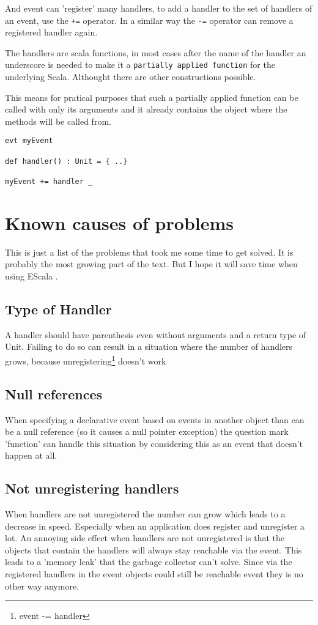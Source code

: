 \documentclass{article}
\newcommand{\escala}[0]{EScala }
\begin{document}
And event can 'register' many handlers, to add a handler to the
set of handlers of an event, use the {\tt +=} operator. In a similar
way the {\tt -=} operator can remove a registered handler again. 

The handlers are scala functions, in most cases after the name of 
the handler an underscore is  needed to make it 
a {\tt partially applied function} for the underlying Scala. 
Althought there are other constructions possible.


This means for pratical purposes that such a partially applied 
function can be called with only its arguments and it already 
contains the object where the methods will be called from.

\begin{lstlisting}
evt myEvent

def handler() : Unit = { ..}

myEvent += handler _
\end{lstlisting}

\section{Known causes of problems}

This is just a list of the problems that took me some
time to get solved. It is probably the most growing part
of the text. But I hope it will save time when using \escala.

\subsection{Type of Handler}
A handler should have parenthesis even without arguments and
a return type of Unit. Failing to do so can result in a situation
where the number of handlers grows, because 
unregistering\footnote{event -= handler} doesn't work

\subsection{Null references}
When specifying a declarative event based on events in another object
than can be a null reference (so it causes a null pointer exception)
the question mark 'function' can handle this situation by considering this
as an event that doesn't happen at all.

\subsection{Not unregistering handlers}
When handlers are not unregistered the number can grow which leads to
a decrease in speed. Especially when an application does register and
unregister a lot. An annoying side effect when handlers are not unregistered
is that the objects that contain the handlers will always stay reachable
via the event. This leads to a 'memory leak' that the garbage collector
can't solve. Since via the registered handlers in the event objects 
could still be reachable event they is no other way anymore.
\end{document}
